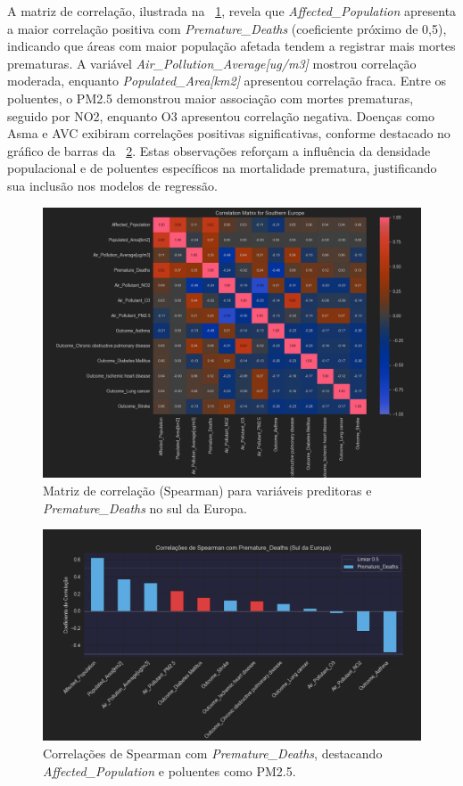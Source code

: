 \documentclass[conference]{IEEEtran}
\begin{document}
A matriz de correlação, ilustrada na \figurename~\ref{fig:correlation_heatmap}, revela que \textit{Affected\_Population} apresenta a maior correlação positiva com \textit{Premature\_Deaths} (coeficiente próximo de 0,5), indicando que áreas com maior população afetada tendem a registrar mais mortes prematuras. A variável \textit{Air\_Pollution\_Average[ug/m3]} mostrou correlação moderada, enquanto \textit{Populated\_Area[km2]} apresentou correlação fraca. Entre os poluentes, o PM2.5 demonstrou maior associação com mortes prematuras, seguido por NO2, enquanto O3 apresentou correlação negativa. Doenças como Asma e AVC exibiram correlações positivas significativas, conforme destacado no gráfico de barras da \figurename~\ref{fig:correlation_bar}. Estas observações reforçam a influência da densidade populacional e de poluentes específicos na mortalidade prematura, justificando sua inclusão nos modelos de regressão.

\begin{figure}[h]
	\centering
	\includegraphics[width=0.9\linewidth]{matrix_correlacao}
	\caption{Matriz de correlação (Spearman) para variáveis preditoras e \textit{Premature\_Deaths} no sul da Europa.}
	\label{fig:correlation_heatmap}
\end{figure}

\begin{figure}[h]
	\centering
	\includegraphics[width=0.9\linewidth]{correlacao_barras}
	\caption{Correlações de Spearman com \textit{Premature\_Deaths}, destacando \textit{Affected\_Population} e poluentes como PM2.5.}
	\label{fig:correlation_bar}
\end{figure}
\end{document}
